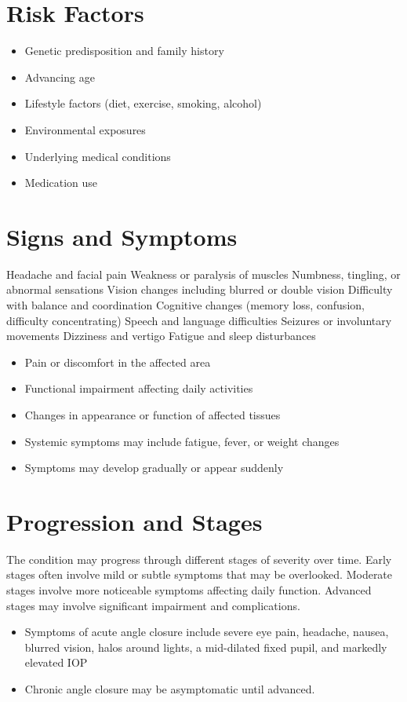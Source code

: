 \section{Risk Factors}
\begin{itemize}[noitemsep]
  \item Genetic predisposition and family history
  \item Advancing age
  \item Lifestyle factors (diet, exercise, smoking, alcohol)
  \item Environmental exposures
  \item Underlying medical conditions
  \item Medication use
\end{itemize}
\section{Signs and Symptoms}
Headache and facial pain Weakness or paralysis of muscles Numbness, tingling, or abnormal sensations Vision changes including blurred or double vision Difficulty with balance and coordination Cognitive changes (memory loss, confusion, difficulty concentrating) Speech and language difficulties Seizures or involuntary movements Dizziness and vertigo Fatigue and sleep disturbances

\begin{itemize}[noitemsep]
  \item Pain or discomfort in the affected area
  \item Functional impairment affecting daily activities
  \item Changes in appearance or function of affected tissues
  \item Systemic symptoms may include fatigue, fever, or weight changes
  \item Symptoms may develop gradually or appear suddenly
\end{itemize}
\section{Progression and Stages}
The condition may progress through different stages of severity over time. Early stages often involve mild or subtle symptoms that may be overlooked. Moderate stages involve more noticeable symptoms affecting daily function. Advanced stages may involve significant impairment and complications.

\begin{itemize}[noitemsep]
  \item Symptoms of acute angle closure include severe eye pain, headache, nausea, blurred vision, halos around lights, a mid-dilated fixed pupil, and markedly elevated IOP
  \item Chronic angle closure may be asymptomatic until advanced.
\end{itemize}
